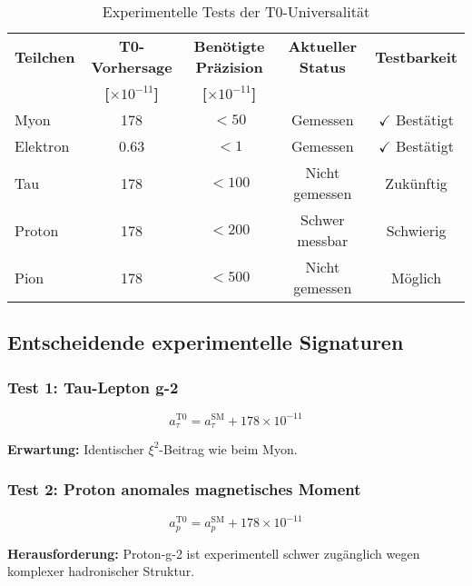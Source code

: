 \documentclass[12pt,a4paper]{article}
\newcommand{\xipar}{\xi}
\begin{document}
	\begin{table}[H]
		\centering
		\caption{Experimentelle Tests der T0-Universalität}
		\begin{tabular}{@{}lcccc@{}}
			\toprule
			\textbf{Teilchen} & \textbf{T0-Vorhersage} & \textbf{Benötigte Präzision} & \textbf{Aktueller Status} & \textbf{Testbarkeit} \\
			& \textbf{[$\times 10^{-11}$]} & \textbf{[$\times 10^{-11}$]} & & \\
			\midrule
			\rowcolor{green!30}
			Myon & 178 & $< 50$ & Gemessen & $\checkmark$ Bestätigt \\
			\rowcolor{green!30}
			Elektron & 0.63 & $< 1$ & Gemessen & $\checkmark$ Bestätigt \\
			\rowcolor{yellow!20}
			Tau & 178 & $< 100$ & Nicht gemessen & Zukünftig \\
			\rowcolor{blue!10}
			Proton & 178 & $< 200$ & Schwer messbar & Schwierig \\
			\rowcolor{blue!10}
			Pion & 178 & $< 500$ & Nicht gemessen & Möglich \\
			\bottomrule
		\end{tabular}
	\end{table}
	
	\subsection{Entscheidende experimentelle Signaturen}
	
	\subsubsection{Test 1: Tau-Lepton g-2}
	
	\begin{equation}
		a_\tau^{\text{T0}} = a_\tau^{\text{SM}} + 178 \times 10^{-11}
	\end{equation}
	
	\textbf{Erwartung:} Identischer $\xipar^2$-Beitrag wie beim Myon.
	
	\subsubsection{Test 2: Proton anomales magnetisches Moment}
	
	\begin{equation}
		a_p^{\text{T0}} = a_p^{\text{SM}} + 178 \times 10^{-11}
	\end{equation}
	
	\textbf{Herausforderung:} Proton-g-2 ist experimentell schwer zugänglich wegen komplexer hadronischer Struktur.
	
\end{document}
